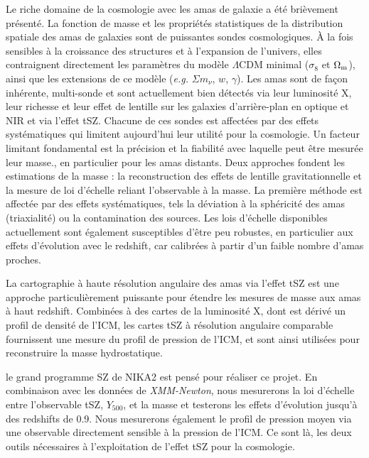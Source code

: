 Le riche domaine de la cosmologie avec les amas de galaxie a été brièvement présenté. La fonction de masse et les propriétés statistiques de la distribution spatiale des amas de galaxies sont de puissantes sondes cosmologiques. 
\`A la fois sensibles à la croissance des structures et à l'expansion de l'univers, elles contraignent directement les paramètres du modèle $\Lambda$CDM minimal ($\sigma_8$ et $\Omega_{\rm{m}}$), ainsi que les extensions de ce modèle (\emph{e.g.} $\Sigma m_\nu$, $w$, $\gamma$). 
Les amas sont de façon inhérente, multi-sonde et sont actuellement bien détectés via leur luminosité X, leur richesse et leur effet de lentille sur les galaxies d'arrière-plan en optique et NIR et via l'effet tSZ. Chacune de ces sondes est affectées par des effets systématiques qui limitent aujourd'hui leur utilité pour la cosmologie. Un facteur limitant fondamental est la précision et la fiabilité avec laquelle peut être mesurée leur masse., en particulier pour les amas distants. Deux approches fondent les estimations de la masse : la reconstruction des effets de lentille gravitationnelle et la mesure de loi d'échelle reliant l'observable à la masse. La première méthode est affectée par des effets systématiques, tels la déviation à la sphéricité des amas (triaxialité) ou la contamination des sources. Les lois d'échelle disponibles actuellement sont également susceptibles d'être peu robustes, en particulier aux effets d'évolution avec le redshift, car calibrées à partir d'un faible nombre d'amas proches. 

La cartographie à haute résolution angulaire des amas via l'effet tSZ est une approche particulièrement puissante pour étendre les mesures de masse aux amas à haut redshift. Combinées à des cartes de la luminosité X, dont est dérivé un profil de densité de l'ICM, les cartes tSZ à résolution angulaire comparable fournissent une mesure du profil de pression de l'ICM, et sont ainsi utilisées pour reconstruire la masse hydrostatique. 

le grand programme SZ de NIKA2 est pensé pour réaliser ce projet. En combinaison avec les données de \emph{XMM-Newton}, nous mesurerons la loi d'échelle entre l'observable tSZ, $Y_{500}$, et la masse et testerons les effets d'évolution jusqu'à des redshifts de 0.9. Nous mesurerons également le profil de pression moyen via une observable directement sensible à la pression de l'ICM. Ce sont là, les deux outils nécessaires à l'exploitation de l'effet tSZ pour la cosmologie. 

